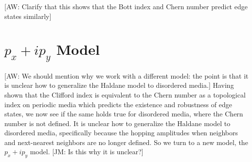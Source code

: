 \documentclass[a4paper]{article}
\newcommand{\aw}[1]{{\color{blue} [AW: #1]}}
\newcommand{\jm}[1]{{\color{red} [JM: #1]}}
\begin{document}
\aw{Clarify that this shows that the Bott index and Chern number predict edge states similarly}

\section{\texorpdfstring{$p_x + ip_y$}{px + ipy} Model}
\aw{We should mention why we work with a different model: the point is that it is unclear how to generalize the Haldane model to disordered media.}
Having shown that the Clifford index is equivalent to the Chern number as a topological index on periodic media which predicts the existence and robustness of edge states, we now see if the same holds true for disordered media, where the Chern number is not defined.
It is unclear how to generalize the Haldane model to disordered media, specifically because the hopping amplitudes when neighbors and next-nearest neighbors are no longer defined.
So we turn to a new model, the $p_x + ip_y$ model.
\jm{Is this why it is unclear?}
\end{document}
